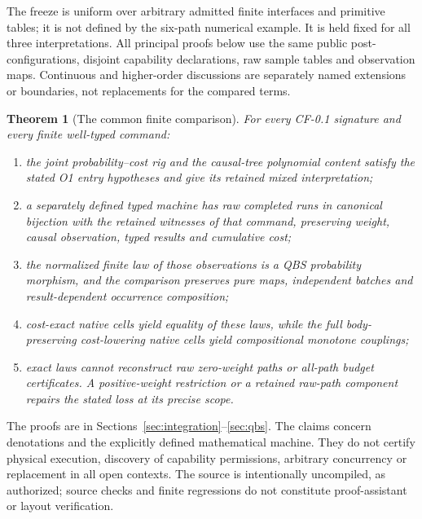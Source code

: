 \documentclass[11pt,a4paper]{article}
\newtheorem{theorem}{Theorem}[section]
\theoremstyle{definition}
\begin{document}
The freeze is uniform over arbitrary admitted finite interfaces and primitive
tables; it is not defined by the six-path numerical example. It is held
fixed for all three interpretations. All principal proofs below use the
same public post-configurations, disjoint capability declarations, raw
sample tables and observation maps. Continuous and higher-order discussions
are separately named extensions or boundaries, not replacements for the
compared terms.

\begin{theorem}[The common finite comparison]\label{thm:main}
For every CF-0.1 signature and every finite well-typed command:
\begin{enumerate}[label=\textup{(\roman*)}]
\item the joint probability--cost rig and the causal-tree polynomial content
satisfy the stated O1 entry hypotheses and give its retained mixed
interpretation;
\item a separately defined typed machine has raw completed runs in canonical
bijection with the retained witnesses of that command, preserving weight,
causal observation, typed results and cumulative cost;
\item the normalized finite law of those observations is a QBS probability
morphism, and the comparison preserves pure maps, independent batches and
result-dependent occurrence composition;
\item cost-exact native cells yield equality of these laws, while the full
body-preserving cost-lowering native cells yield compositional monotone
couplings;
\item exact laws cannot reconstruct raw zero-weight paths or all-path budget
certificates. A positive-weight restriction or a retained raw-path component
repairs the stated loss at its precise scope.
\end{enumerate}
\end{theorem}
The proofs are in Sections~\ref{sec:integration}--\ref{sec:qbs}.
The claims concern denotations and the explicitly defined mathematical
machine. They do not certify physical execution, discovery of capability
permissions, arbitrary concurrency or replacement in all open contexts.
The source is intentionally uncompiled, as authorized; source checks and
finite regressions do not constitute proof-assistant or layout verification.
\end{document}
